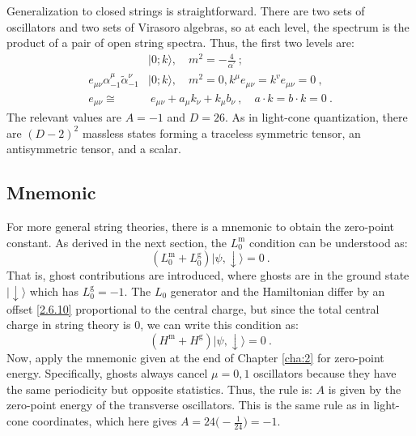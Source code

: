 Generalization to closed strings is straightforward. There are two sets of oscillators and two sets of Virasoro algebras, so at each level, the spectrum is the product of a pair of open string spectra. Thus, the first two levels are:
\begin{subequations} \label{4.1.21}
	\begin{align}
		&|0 ; k\rangle, \quad m^{2}=-\frac{4}{\alpha^{\prime}} \:; \label{4.1.21a}\\
		e_{\mu \nu} \alpha_{-1}^{\mu} \tilde{\alpha}_{-1}^{\nu} &|0 ; k\rangle, \quad m^{2}=0, k^{\mu} e_{\mu \nu}=k^{v} e_{\mu \nu}=0 \:, \label{4.1.21b}\\
		e_{\mu \nu} \cong &\: e_{\mu \nu}+a_{\mu} k_{\nu}+k_{\mu} b_{\nu}\:,\quad  a \cdot k=b \cdot k=0 \:.\label{4.1.21c}
	\end{align}
\end{subequations}
The relevant values are $A=-1$ and $D=26$. As in light-cone quantization, there are $(D-2)^{2}$ massless states forming a traceless symmetric tensor, an antisymmetric tensor, and a scalar.

\subsection*{Mnemonic}
For more general string theories, there is a mnemonic to obtain the zero-point constant. As derived in the next section, the $L_0^{\mathrm{m}}$ condition can be understood as:
\begin{equation}\label{4.1.22}
	(L_{0}^{\mathrm{m}}+L_{0}^{\mathrm{g}})|\psi, \downarrow\rangle=0 \:. 
\end{equation}
That is, ghost contributions are introduced, where ghosts are in the ground state $\lvert\downarrow\rangle$ which has $L_{0}^{\mathrm{g}}=-1$. The $L_{0}$ generator and the Hamiltonian differ by an offset \eqref{2.6.10} proportional to the central charge, but since the total central charge in string theory is 0, we can write this condition as:
\begin{equation}
	(H^{\mathrm{m}}+H^{\mathrm{g}})|\psi, \downarrow\rangle=0 \:. \label{4.1.23}
\end{equation}
Now, apply the mnemonic given at the end of Chapter \ref{cha:2} for zero-point energy. Specifically, ghosts always cancel $\mu=0,1$ oscillators because they have the same periodicity but opposite statistics. Thus, the rule is: $A$ is given by the zero-point energy of the transverse oscillators. This is the same rule as in light-cone coordinates, which here gives $A=24\bigl(-\frac{1}{24}\bigr)=-1$.

